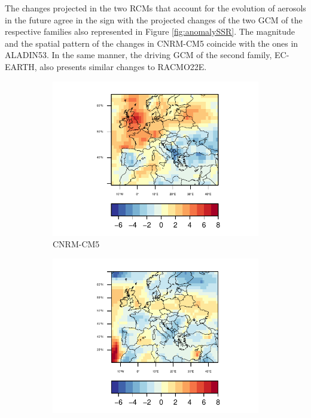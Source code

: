 The changes projected in the two RCMs that account for the evolution of aerosols in the future agree in the sign with the projected changes of the two GCM of the respective families also represented in Figure \ref{fig:anomalySSR}. The magnitude and the spatial pattern of the changes in CNRM-CM5 coincide with the ones in ALADIN53. In the same manner, the driving GCM of the second family, EC-EARTH, also presents similar changes to RACMO22E. 

\begin{figure}[h]
  \centering\begin{subfigure}{0.4\textwidth}
    \includegraphics[width=1.4\textwidth]{figs/capitulo7/CNRM-CM5_ANOMALIAS_JJA_CLT_2050-2021.pdf}
    \caption{CNRM-CM5}
  \end{subfigure}
  \centering\begin{subfigure}{0.4\textwidth}
    \includegraphics[width=1.4\textwidth]{figs/capitulo7/EC-EARTH_ANOMALIAS_JJA_CLT_2050-2021.pdf}\hfill

\end{subfigure}
\end{figure}
